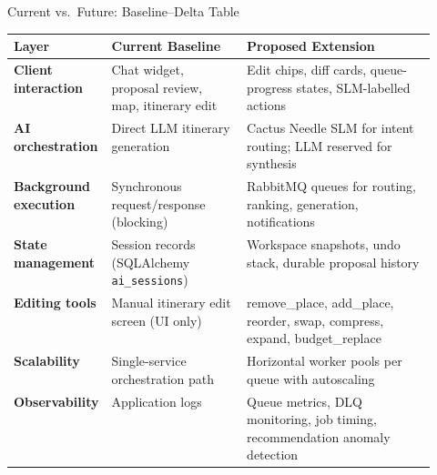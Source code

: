 \documentclass[aspectratio=169,professionalfonts]{beamer}
\begin{document}
\begin{frame}{Current vs.\ Future: Baseline--Delta Table}
  \begin{table}
    \footnotesize\centering
    \begin{tabularx}{\linewidth}{>{\bfseries}p{0.22\linewidth}
                                  >{\raggedright\arraybackslash}p{0.32\linewidth}
                                  >{\raggedright\arraybackslash}X}
      \toprule
      Layer & Current Baseline & Proposed Extension \\
      \midrule
      Client interaction
        & Chat widget, proposal review, map, itinerary edit
        & Edit chips, diff cards, queue-progress states, SLM-labelled actions \\
      AI orchestration
        & Direct LLM itinerary generation
        & Cactus Needle SLM for intent routing; LLM reserved for synthesis \\
      Background execution
        & Synchronous request/response (blocking)
        & RabbitMQ queues for routing, ranking, generation, notifications \\
      State management
        & Session records (SQLAlchemy \texttt{ai\_sessions})
        & Workspace snapshots, undo stack, durable proposal history \\
      Editing tools
        & Manual itinerary edit screen (UI only)
        & remove\_place, add\_place, reorder, swap, compress, expand, budget\_replace \\
      Scalability
        & Single-service orchestration path
        & Horizontal worker pools per queue with autoscaling \\
      Observability
        & Application logs
        & Queue metrics, DLQ monitoring, job timing, recommendation anomaly detection \\
      \bottomrule
    \end{tabularx}
  \end{table}
\end{frame}
\end{document}
